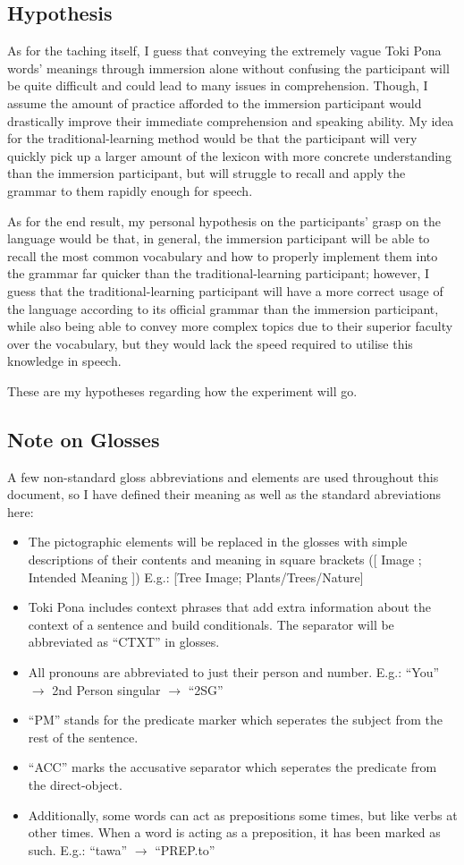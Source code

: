 \documentclass[a4paper,10pt]{article}
\begin{document}
\subsection{Hypothesis}
As for the taching itself, I guess that conveying the extremely vague Toki Pona words' meanings
through immersion alone without confusing the participant will be quite difficult and could lead to
many issues in comprehension. Though, I assume the amount of practice afforded to the immersion
participant would drastically improve their immediate comprehension and speaking ability. My idea
for the traditional-learning method would be that the participant will very quickly pick up a
larger amount of the lexicon with more concrete understanding than the immersion participant, but
will struggle to recall and apply the grammar to them rapidly enough for speech.

As for the end result, my personal hypothesis on the participants' grasp on the language
would be that, in general, the immersion participant will be able to recall the most common vocabulary
and how to properly implement them into the grammar far quicker than the traditional-learning
participant; however, I guess that the traditional-learning participant will have a more correct
usage of the language according to its official grammar than the immersion participant, while also
being able to convey more complex topics due to their superior faculty over the vocabulary, but they
would lack the speed required to utilise this knowledge in speech.

These are my hypotheses regarding how the experiment will go.

\subsection{Note on Glosses}
A few non-standard gloss abbreviations and elements are used
throughout this document, so I have defined their meaning as well as the
standard abreviations here:
\begin{itemize}
 \item The pictographic
 elements will be replaced in the glosses with simple descriptions of their
 contents and meaning in square brackets ([ Image ; Intended Meaning ])
 E.g.: [Tree Image; Plants/Trees/Nature]
 \item Toki Pona includes context phrases that add extra information
 about the context of a sentence and build conditionals. The separator
 will be abbreviated as ``CTXT'' in glosses.
 \item All pronouns are abbreviated to just their person and number.
 E.g.: ``You'' $\rightarrow$ 2nd Person singular $\rightarrow$ ``2SG''
 \item ``PM'' stands for the predicate marker which seperates the subject
 from the rest of the sentence.
 \item ``ACC'' marks the accusative separator which seperates the predicate
 from the direct-object.
 \item Additionally, some words can act as prepositions some times, but like
 verbs at other times. When a word is acting as a preposition, it has been
 marked as such. E.g.: ``tawa'' $\rightarrow$ ``PREP.to''
\end{itemize}
\end{document}
